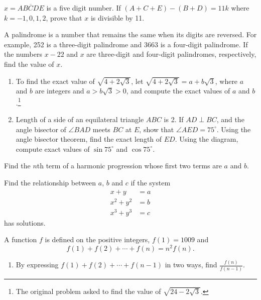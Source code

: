 \begin{problems}
    \problem $x = \overline{ABCDE}$ is a five digit number. If $(A + C + E) -
    (B + D) = 11k$ where $k = -1, 0, 1, 2$, prove that $x$ is divisible by 11. 
    
    \problem A palindrome is a number that remains the same when its digits are
    reversed. For example, 252 is a three-digit palindrome and 3663 is a
    four-digit palindrome. If the numbers $x - 22$ and $x$ are three-digit and
    four-digit palindromes, respectively, find the value of $x$.
    
    \problem 
    \begin{enumerate}
        \item To find the exact value of $\sqrt{4 + 2\sqrt{3}}$, let $\sqrt{4 +
            2\sqrt{3}} = a + b\sqrt{3}$, where $a$ and $b$ are integers and $a
            > b\sqrt{3} > 0$, and compute the exact values of $a$ and
            $b$.\footnote{The original problem asked to find the value of
            $\sqrt{24 - 2\sqrt{3}}$.}

        \item Length of a side of an equilateral triangle $ABC$ is 2. If $AD
            \perp BC$, and the angle bisector of $\angle BAD$ meets $BC$ at
            $E$, show that $\angle AED = 75^\circ$. Using the angle bisector
            theorem, find the exact length of $ED$. Using the diagram, compute
            exact values of $\sin 75^\circ$ and $\cos 75^\circ$.
    \end{enumerate}
    
    \problem Find the $n$th term of a harmonic progression whose first two
    terms are $a$ and $b$. 
    
    \problem Find the relationship between $a$, $b$ and $c$ if the system 
    \begin{align*}
        x + y &= a\\
        x^2 + y^2 &= b\\
        x^3 + y^3 &= c
    \end{align*}
    has solutions. 
    
    \problem A function $f$ is defined on the positive integers, $f(1) = 1009$
    and 
    \[f(1) + f(2) + \cdots + f(n) = n^2 f(n).\]
    \begin{enumerate}
        \item By expressing $f(1) + f(2) + \cdots + f(n - 1)$ in two ways, find
            $\frac{f(n)}{f(n - 1)}$. 
        

\end{enumerate}
\end{problems}
